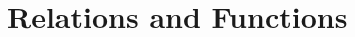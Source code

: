 \documentclass[oneside,10pt,openany,final]{book}
\begin{document}


\rule{0in}{8in}
\doclicenseThis

\cleardoublepage
\titlespacing*{\chapter} {0in}{0pt}{9pt}
\tableofcontents
\titlespacing*{\chapter} {-2.125in}{0pt}{9pt}

\restoregeometry

\mainmatter
\pagestyle{fancy}

\chapter{Relations and Functions}
\chaptertoc  %
\newpage




\begin{adjustwidth}{-2in}{0in}
\titlespacing*{\chapter} {0in}{0pt}{9pt} %
\printindex
\end{adjustwidth}
\end{document}
